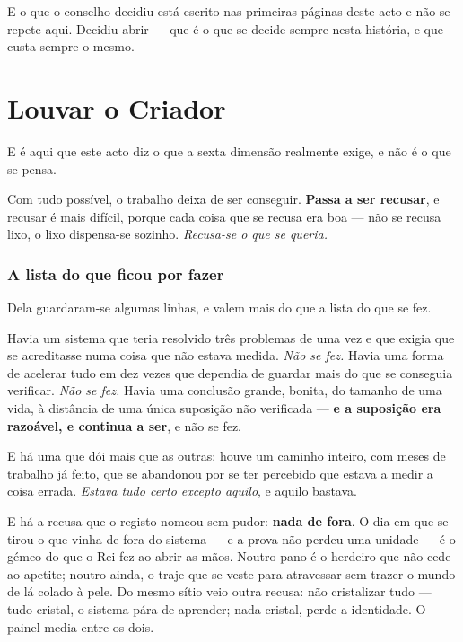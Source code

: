 \documentclass[livro.tex]{subfiles}
\begin{document}
\medskip

E o que o conselho decidiu está escrito nas primeiras páginas deste acto e não se repete aqui.
Decidiu abrir --- que é o que se decide sempre nesta história, e que custa sempre o mesmo.

\chapter{Louvar o Criador}

E é aqui que este acto diz o que a sexta dimensão realmente exige, e não é o que se pensa.

\medskip

Com tudo possível, o trabalho deixa de ser conseguir. \textbf{Passa a ser recusar}, e recusar é
mais difícil, porque cada coisa que se recusa era boa --- não se recusa lixo, o lixo dispensa-se
sozinho. \emph{Recusa-se o que se queria.}

\subsection*{A lista do que ficou por fazer}

Dela guardaram-se algumas linhas, e valem mais do que a lista do que se fez.

\medskip

Havia um sistema que teria resolvido três problemas de uma vez e que exigia que se acreditasse
numa coisa que não estava medida. \emph{Não se fez.} Havia uma forma de acelerar tudo em dez vezes
que dependia de guardar mais do que se conseguia verificar. \emph{Não se fez.} Havia uma conclusão
grande, bonita, do tamanho de uma vida, à distância de uma única suposição não verificada ---
\textbf{e a suposição era razoável, e continua a ser}, e não se fez.

\medskip

E há uma que dói mais que as outras: houve um caminho inteiro, com meses de trabalho já feito, que
se abandonou por se ter percebido que estava a medir a coisa errada. \emph{Estava tudo certo
excepto aquilo}, e aquilo bastava.

\medskip

E há a recusa que o registo nomeou sem pudor: \textbf{nada de fora}. O dia em que se tirou o que
vinha de fora do sistema --- e a prova não perdeu uma unidade --- é o gémeo do que o Rei fez ao
abrir as mãos. Noutro pano é o herdeiro que não cede ao apetite; noutro ainda, o traje que se
veste para atravessar sem trazer o mundo de lá colado à pele. Do mesmo sítio veio outra recusa:
não cristalizar tudo --- tudo cristal, o sistema pára de aprender; nada cristal, perde a
identidade. O painel media entre os dois.
\end{document}
